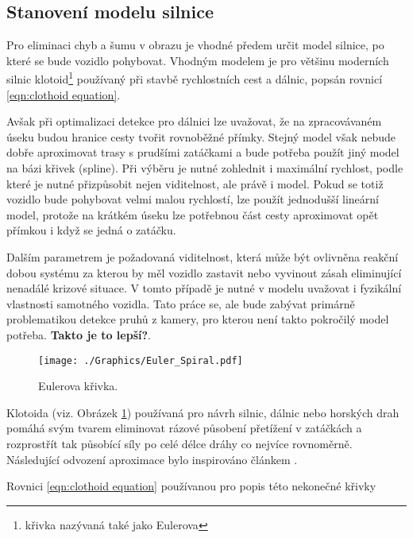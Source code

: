\documentclass[czech, bc, kky, he, iso690numb]{fasthesis}
\begin{document}
            \subsection{Stanovení modelu silnice}\label{chap:01_stanoveni_modelu_silnice}
                Pro eliminaci chyb a šumu v obrazu je vhodné předem určit model silnice, po které se bude vozidlo pohybovat. Vhodným modelem je pro většinu moderních silnic klotoid\footnote{křivka nazývaná také jako Eulerova} používaný při stavbě rychlostních cest a dálnic, popsán rovnicí \ref{eqn:clothoid equation}.
                
                Avšak při optimalizaci detekce pro dálnici lze uvažovat, že na zpracovávaném úseku budou hranice cesty tvořit rovnoběžné přímky. Stejný model však nebude dobře aproximovat trasy s prudšími zatáčkami a bude potřeba použít jiný model na bázi křivek (spline). Při výběru je nutné zohlednit i maximální rychlost, podle které je nutné přizpůsobit nejen viditelnost, ale právě i model. Pokud se totiž vozidlo bude pohybovat velmi malou rychlostí, lze použít jednodušší lineární model, protože na krátkém úseku lze potřebnou část cesty aproximovat opět přímkou i když se jedná o zatáčku.
                
                Dalším parametrem je požadovaná viditelnost, která může být ovlivněna reakční dobou systému za kterou by měl vozidlo zastavit nebo vyvinout zásah eliminující nenadálé krizové situace. V tomto případě je nutné v modelu uvažovat i fyzikální vlastnosti samotného vozidla. Tato práce se, ale bude zabývat primárně problematikou detekce pruhů z kamery, pro kterou není takto pokročilý model potřeba. \textbf{Takto je to lepší?}.
                
                	\begin{figure}[h]
                		\centering
                		\texttt{[image: ./Graphics/Euler\_Spiral.pdf]}
                		\caption{Eulerova křivka.}
                		\label{pic:Eulerova_krivka}
                	\end{figure}
                
                Klotoida (viz. Obrázek \ref{pic:Eulerova_krivka}) používaná pro návrh silnic, dálnic nebo horských drah pomáhá svým tvarem eliminovat rázové působení přetížení v zatáčkách a rozprostřít tak působící síly po celé délce dráhy co nejvíce rovnoměrně. Následující odvození aproximace bylo inspirováno článkem \cite{eliou_kaliabetsos_2013}.
                
                Rovnici \ref{eqn:clothoid equation} používanou pro popis této nekonečné křivky 
                    
\end{document}
